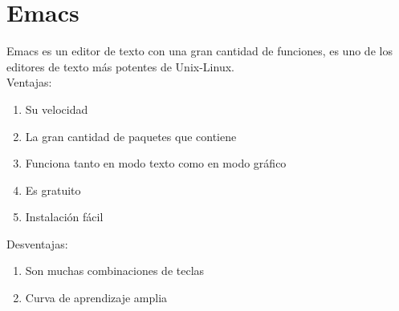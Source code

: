 \documentclass{book} %
\begin{document}
\section{Emacs}
Emacs es un editor de texto con una gran cantidad de funciones, es uno de los editores de texto más potentes de Unix-Linux.\\
Ventajas:
\begin{enumerate}
	\item Su velocidad
	\item La gran cantidad de paquetes que contiene
	\item Funciona tanto en modo texto como en modo gráfico
	\item Es gratuito
	\item Instalación fácil
\end{enumerate}
Desventajas:
\begin{enumerate}
	\item Son muchas combinaciones de teclas 
	\item Curva de aprendizaje amplia
\end{enumerate}
\end{document}
